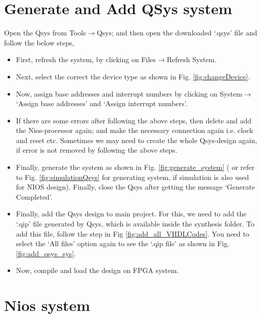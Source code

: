 \section{Generate and Add QSys system}

Open the Qsys from Tools$\rightarrow$Qsys; and then open the downloaded `.qsys' file and follow the below steps, 

\begin{itemize}
	\item First, refresh the system, by clicking on Files$\rightarrow$Refresh System.
	
	\item Next, select the correct the device type as shown in Fig. \ref{fig:changeDevice}. 
	
	\item Now, assign base addresses and interrupt numbers by clicking on System$\rightarrow$`Assign base addresses' and `Assign interrupt numbers'.
	
	\item If there are some errors after following the above steps, then delete and add the Nios-processor again; and make the necessary connection again i.e. clock and reset etc. Sometimes we may need to create the whole Qsys-design again, if error is not removed by following the above steps. 
	
	\item Finally, generate the system as shown in Fig. \ref{fig:generate_system} ( or refer to  Fig. \ref{fig:simulationQsys} for generating system, if simulation is also used for NIOS design). Finally, close the Qsys after getting the message `Generate Completed'. 
	
	\item Finally, add the Qsys design to main project. For this, we need to add the `.qip' file generated by Qsys, which is available inside the synthesis folder. To add this file, follow the step in Fig \ref{fig:add_all_VHDLCodes}. You need to select the 	`All files' option again to see the `.qip file' as shown in Fig. \ref{fig:add_qsys_sys}. 
	
	
	\item Now, compile and load the design on FPGA system. 
\end{itemize}


\section{Nios system} \label{sec:nios_again_implement}

